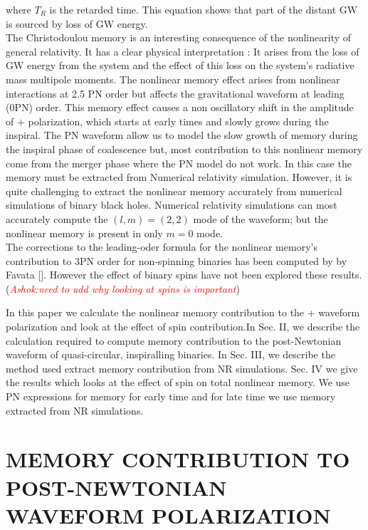 \documentclass[prd,preprintnumbers,twocolumn,eqsecnum,floatfix,letter]{revtex4}
\newcommand{\ashok}[1]{\textcolor{red}{\textit{Ashok:#1}}}
\begin{document}
where $T_{R}$ is the retarded time. This equation shows that part of the distant GW is sourced by loss of GW energy.\\
The Christodoulou memory is an interesting consequence of the nonlinearity of general relativity. It has a clear physical interpretation : It arises from the loss of GW energy from the system and the effect of this loss on the system's radiative mass multipole moments. The nonlinear memory effect arises from nonlinear interactions at 2.5 PN order but affects the gravitational waveform at leading (0PN) order. This memory effect causes a non oscillatory shift in the amplitude of $+$ polarization, which starts at early times and slowly grows during the inspiral. The PN waveform allow us to model the slow growth of memory during the inspiral phase of coalescence but, most contribution to this nonlinear memory come from the merger phase where the PN model do not work. In this case the memory must be extracted from Numerical relativity simulation. However, it is quite challenging to extract the nonlinear memory accurately from numerical simulations of binary black holes. Numerical relativity simulations can most accurately compute the $(l, m) = (2, 2)$ mode of the waveform; but the nonlinear memory is present in only $m=0$ mode.\\


The corrections to the leading-oder formula for the nonlinear memory's contribution to 3PN order for non-spinning binaries has been computed by by Favata []. However the effect of binary spins have not been explored these results.(\ashok{need to add why looking at spins is important})   



In this paper we calculate the nonlinear memory contribution to the + waveform polarization and look at the effect of spin contribution.In Sec. II, we describe the calculation required to compute memory contribution to the post-Newtonian waveform of quasi-circular, inspiralling binaries. In Sec. III, we describe the method used extract memory contribution from NR simulations. Sec. IV we give the results which looks at the effect of spin on total nonlinear memory. We use PN expressions for memory for early time and for late time we use memory extracted from NR simulations.


\section{MEMORY CONTRIBUTION TO POST-NEWTONIAN WAVEFORM POLARIZATION}
\end{document}
